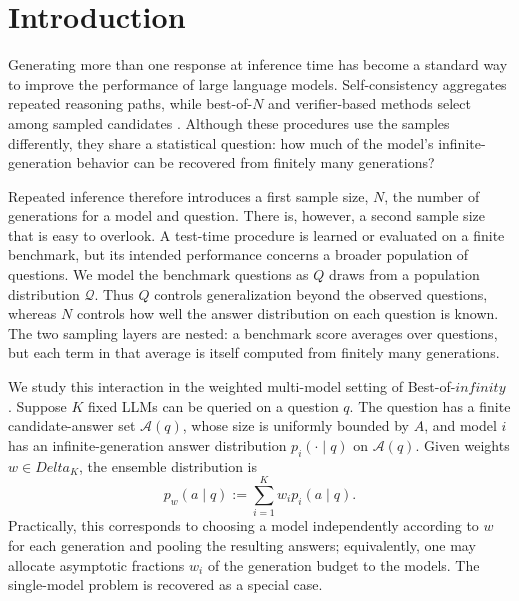 \documentclass[11pt]{article}
\def\infty{infinity}%
\def\Delta{Delta}%
\newcommand{\calQ}{\mathcal Q}
\newcommand{\calA}{\mathcal A}
\begin{document}
\section{Introduction}

Generating more than one response at inference time has become a standard way to improve the performance of large language models.  Self-consistency aggregates repeated reasoning paths, while best-of-$N$ and verifier-based methods select among sampled candidates \citep{WangSelfConsistency,CobbeVerifiers,HuangBestN,MukherjeeOT}.  Although these procedures use the samples differently, they share a statistical question: how much of the model's infinite-generation behavior can be recovered from finitely many generations?

Repeated inference therefore introduces a first sample size, $N$, the number of generations for a model and question.  There is, however, a second sample size that is easy to overlook.  A test-time procedure is learned or evaluated on a finite benchmark, but its intended performance concerns a broader population of questions.  We model the benchmark questions as $Q$ draws from a population distribution $\calQ$.  Thus $Q$ controls generalization beyond the observed questions, whereas $N$ controls how well the answer distribution on each question is known.  The two sampling layers are nested: a benchmark score averages over questions, but each term in that average is itself computed from finitely many generations.

We study this interaction in the weighted multi-model setting of Best-of-$\infty$ \citep{KomiyamaBoInf}.  Suppose $K$ fixed LLMs can be queried on a question $q$.  The question has a finite candidate-answer set $\calA(q)$, whose size is uniformly bounded by $A$, and model $i$ has an infinite-generation answer distribution $p_i(\cdot\mid q)$ on $\calA(q)$.  Given weights $w\in\Delta_K$, the ensemble distribution is
\begin{equation}
\label{eq:intro-mixture}
p_w(a\mid q)
:=
\sum_{i=1}^K w_i p_i(a\mid q).
\end{equation}
Practically, this corresponds to choosing a model independently according to $w$ for each generation and pooling the resulting answers; equivalently, one may allocate asymptotic fractions $w_i$ of the generation budget to the models.  The single-model problem is recovered as a special case.
\end{document}
